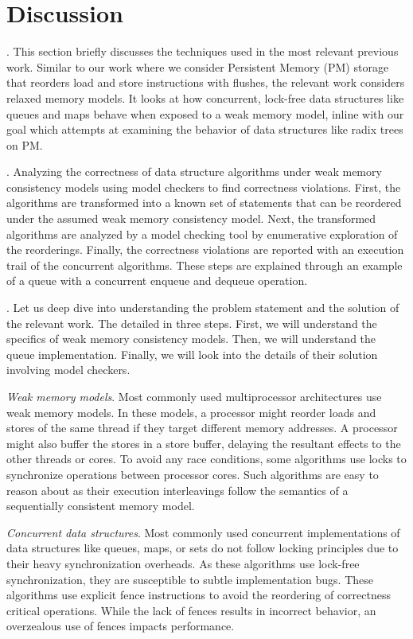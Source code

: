 \section{Discussion}

.
This section briefly discusses the techniques used in the most relevant previous work.
Similar to our work where we consider Persistent Memory (PM) storage that reorders load
and store instructions with flushes, the relevant work considers relaxed memory models.
It looks at how concurrent, lock-free data structures like queues and maps behave when
exposed to a weak memory model, inline with our goal which attempts at examining the
behavior of data structures like radix trees on PM.

. Analyzing the correctness of data structure algorithms under weak memory
consistency models using model checkers to find correctness violations. First, the algorithms
are transformed into a known set of statements that can be reordered under the assumed
weak memory consistency model. Next, the transformed algorithms are analyzed by a model checking
tool by enumerative exploration of the reorderings. Finally, the correctness violations are
reported with an execution trail of the concurrent algorithms. These steps are explained through
an example of a queue with a concurrent enqueue and dequeue operation.

. Let us deep dive into understanding the problem statement and the solution
of the relevant work. The detailed in three steps. First, we will understand the specifics of
weak memory consistency models. Then, we will understand the queue implementation. Finally, we
will look into the details of their solution involving model checkers.

\emph{Weak memory models}. Most commonly used multiprocessor architectures use weak memory models.
In these models, a processor might reorder loads and stores of the same thread if they target
different memory addresses. A processor might also buffer the stores in a store buffer, delaying
the resultant effects to the other threads or cores. To avoid any race conditions, some algorithms
use locks to synchronize operations between processor cores. Such algorithms are easy to reason about
as their execution interleavings follow the semantics of a sequentially consistent memory model.

\emph{Concurrent data structures}. Most commonly used concurrent implementations of data structures like
queues, maps, or sets do not follow locking principles due to their heavy synchronization overheads.
As these algorithms use lock-free synchronization, they are susceptible to subtle implementation bugs.
These algorithms use explicit fence instructions to avoid the reordering of correctness critical
operations. While the lack of fences results in incorrect behavior, an overzealous use of fences
impacts performance.

